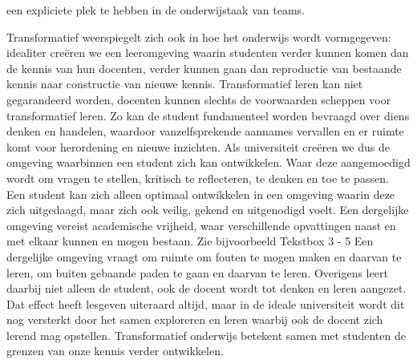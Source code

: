 \documentclass[smallauthor, chapterhaspagenum, nochapterinheader, pagenuminheader,  bigchapnum,medium2, tocpages,  garamond, titleinheader]{jote-book}
\begin{document}
een expliciete plek te hebben in de onderwijstaak van teams.



	Transformatief weerspiegelt zich ook in hoe het onderwijs wordt vormgegeven: idealiter creëren we een leeromgeving waarin studenten verder kunnen komen dan de kennis van hun docenten, verder kunnen gaan dan reproductie van bestaande kennis naar constructie van nieuwe kennis. Transformatief leren kan niet gegarandeerd worden, docenten kunnen slechts de voorwaarden scheppen voor transformatief leren. Zo kan de student fundamenteel worden bevraagd over diens denken en handelen, waardoor vanzelfsprekende aannames vervallen en er ruimte komt voor herordening en nieuwe inzichten. Als universiteit creëren we dus de omgeving waarbinnen een student zich kan ontwikkelen. Waar deze aangemoedigd wordt om vragen te stellen, kritisch te reflecteren, te denken en toe te passen. Een student kan zich alleen optimaal ontwikkelen in een omgeving waarin deze zich uitgedaagd, maar zich ook veilig, gekend en uitgenodigd voelt. Een dergelijke omgeving vereist academische vrijheid, waar verschillende opvattingen naast en met elkaar kunnen en mogen bestaan. Zie bijvoorbeeld Tekstbox 3 - 5 Een dergelijke omgeving vraagt om ruimte om fouten te mogen maken en daarvan te leren, om buiten gebaande paden te gaan en daarvan te leren. Overigens leert daarbij niet alleen de student, ook de docent wordt tot denken en leren aangezet. Dat effect heeft lesgeven uiteraard altijd, maar in de ideale universiteit wordt dit nog versterkt door het samen exploreren en leren waarbij ook de docent zich lerend mag opstellen. Transformatief onderwijs betekent samen met studenten de grenzen van onze kennis verder ontwikkelen.
\end{document}
